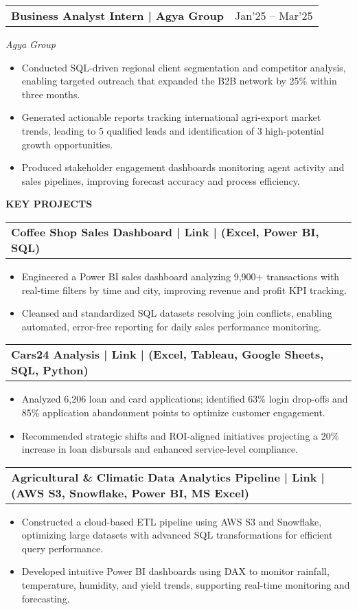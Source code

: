 \documentclass[a4paper]{article}
\makeatletter
\newcommand{\resumesubheading}[3]{
    \vspace{0em}
    \begin{tabularx}{\textwidth}{@{}X r@{}}
        \textbf{#1 | #2} & #3 \\
    \end{tabularx}
    \vspace{-0.2em}
}
\newcommand{\resumeitem}[1]{\item #1}
\makeatother
\begin{document}
\resumesubheading{Business Analyst Intern}{Agya Group}{Jan'25 -- Mar'25}
\textit{Agya Group}
\vspace{-0.2em}
\begin{itemize}
    \resumeitem{Conducted SQL-driven regional client segmentation and competitor analysis, enabling targeted outreach that expanded the B2B network by 25\% within three months.}
    \resumeitem{Generated actionable reports tracking international agri-export market trends, leading to 5 qualified leads and identification of 3 high-potential growth opportunities.}
    \resumeitem{Produced stakeholder engagement dashboards monitoring agent activity and sales pipelines, improving forecast accuracy and process efficiency.}
\end{itemize}

\begin{sectionbox}\textbf{KEY PROJECTS}\end{sectionbox}

\resumesubheading{Coffee Shop Sales Dashboard | Link}{(Excel, Power BI, SQL)}{}
\vspace{-0.2em}
\begin{itemize}
    \resumeitem{Engineered a Power BI sales dashboard analyzing 9,900+ transactions with real-time filters by time and city, improving revenue and profit KPI tracking.}
    \resumeitem{Cleansed and standardized SQL datasets resolving join conflicts, enabling automated, error-free reporting for daily sales performance monitoring.}
\end{itemize}
\vspace{0.4em}

\resumesubheading{Cars24 Analysis | Link}{(Excel, Tableau, Google Sheets, SQL, Python)}{}
\vspace{-0.2em}
\begin{itemize}
    \resumeitem{Analyzed 6,206 loan and card applications; identified 63\% login drop-offs and 85\% application abandonment points to optimize customer engagement.}
    \resumeitem{Recommended strategic shifts and ROI-aligned initiatives projecting a 20\% increase in loan disbursals and enhanced service-level compliance.}
\end{itemize}
\vspace{0.4em}

\resumesubheading{Agricultural \& Climatic Data Analytics Pipeline | Link}{(AWS S3, Snowflake, Power BI, MS Excel)}{}
\vspace{-0.2em}
\begin{itemize}
    \resumeitem{Constructed a cloud-based ETL pipeline using AWS S3 and Snowflake, optimizing large datasets with advanced SQL transformations for efficient query performance.}
    \resumeitem{Developed intuitive Power BI dashboards using DAX to monitor rainfall, temperature, humidity, and yield trends, supporting real-time monitoring and forecasting.}
\end{itemize}
\end{document}

